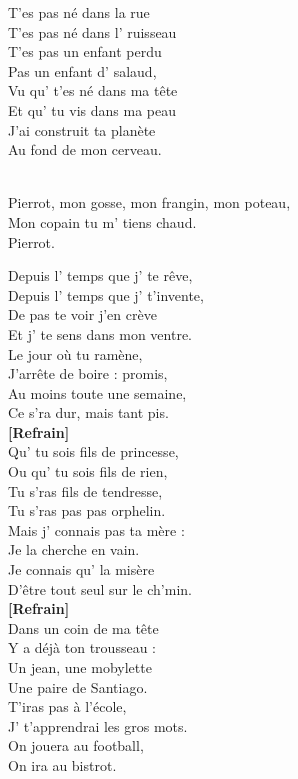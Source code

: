 \documentclass{novel}
\begin{document}
\begin{multicols}{2}
T'es pas né dans la rue \\
T'es pas né dans l' ruisseau \\
T'es pas un enfant perdu \\
Pas un enfant d' salaud, \\
Vu qu' t'es né dans ma tête \\
Et qu' tu vis dans ma peau \\
J'ai construit ta planète \\
Au fond de mon cerveau. \\

\begin{bfseries}
[Refrain:]\\
Pierrot, mon gosse, mon frangin, mon poteau, \\
Mon copain tu m' tiens chaud. \\
Pierrot. \\
\end{bfseries}

Depuis l' temps que j' te rêve, \\
Depuis l' temps que j' t'invente, \\
De pas te voir j'en crève \\
Et j' te sens dans mon ventre. \\
Le jour où tu ramène, \\
J'arrête de boire : promis, \\
Au moins toute une semaine, \\
Ce s'ra dur, mais tant pis. \\

\textbf{[Refrain]} \\

Qu' tu sois fils de princesse, \\
Ou qu' tu sois fils de rien, \\
Tu s'ras fils de tendresse, \\
Tu s'ras pas pas orphelin. \\
Mais j' connais pas ta mère : \\
Je la cherche en vain. \\
Je connais qu' la misère \\
D'être tout seul sur le ch'min. \\

\textbf{[Refrain]} \\

Dans un coin de ma tête \\
Y a déjà ton trousseau : \\
Un jean, une mobylette \\
Une paire de Santiago. \\
T'iras pas à l'école, \\
J' t'apprendrai les gros mots. \\
On jouera au football, \\
On ira au bistrot. \\


\end{multicols}
\end{document}
